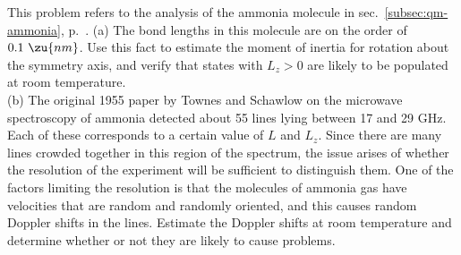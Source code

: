 This problem refers to the analysis of the ammonia molecule in
sec.~\ref{subsec:qm-ammonia}, p.~\pageref{subsec:qm-ammonia}. 
%
(a) The bond lengths in this molecule are on the order of $0.1\
\zu{nm}$. Use this fact to estimate the moment of inertia for rotation
about the symmetry axis, and verify that states with $L_z>0$ are
likely to be populated at room temperature.\\
%
(b) The original 1955 paper by Townes and Schawlow on the microwave
spectroscopy of ammonia detected about 55 lines lying between 17 and
29 GHz. Each of these corresponds to a certain value of $L$ and $L_z$.
Since there are many lines crowded together in this region of the
spectrum, the issue arises of whether the resolution of the experiment
will be sufficient to distinguish them. One of the factors limiting
the resolution is that the molecules of ammonia gas have velocities
that are random and randomly oriented, and this causes random Doppler
shifts in the lines. Estimate the Doppler shifts at room temperature
and determine whether or not they are likely to cause problems. 
